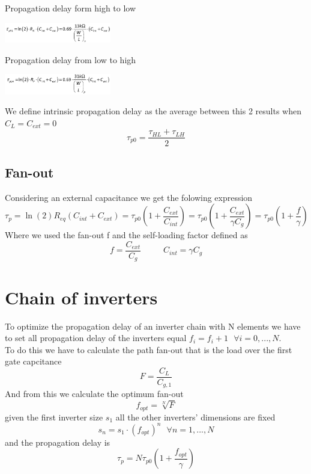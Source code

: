 Propagation delay form high to low

\centering
\includegraphics[width=0.35\textwidth]{C3_11.png}\\
\raggedright

\vspace{5mm}

Propagation delay from low to high 

\centering
\includegraphics[width=0.35\textwidth]{C3_12.png}\\
\raggedright

\vspace{5mm}
We define intrinsic propagation delay as the average between this 2 results when $C_L=C_{ext}=0$
\begin{equation}
\tau_{p0}=\frac{\tau_{HL}+\tau_{LH}}{2}
\end{equation}

\subsection{Fan-out}
Considering an external capacitance we get the folowing expression
\begin{equation}
\tau_p=\ln(2)R_{eq}(C_{int}+C_{ext})=\tau_{p0}\left(1+\frac{C_{ext}}{C_{int}}\right)=\tau_{p0}\left(1+\frac{C_{ext}}{\gamma C_g}\right)=\tau_{p0}\left(1+\frac{f}{\gamma}\right)
\end{equation}
Where we used the fan-out f and the self-loading factor defined as
\begin{equation}
f=\frac{C_{ext}}{C_g}\ \ \ \ \ \ \ \ \ \ \ \ C_{int}=\gamma C_g
\end{equation}

\section{Chain of inverters}

To optimize the propagation delay of an inverter chain with N elements we have to set all propagation delay of the inverters equal $f_i=f_i+1\ \ \  \forall i=0,...,N$.\\
To do this we have to calculate the path fan-out that is the load over the first gate capcitance
\begin{equation}
F=\frac{C_L}{C_{g,1}}
\end{equation} 
And from this we calculate the optimum fan-out 
\begin{equation}
f_{opt}=\sqrt[N]{F}
\end{equation}
given the first inverter size $s_1$ all the other inverters' dimensions are fixed 
\begin{equation}
s_n=s_1\cdot (f_{opt})^{n} \ \ \ \forall n=1,...,N 
\end{equation} 
and the propagation delay is 
\begin{equation}
\tau_p=N\tau_{p0}\left(1+\frac{f_{opt}}{\gamma} \right)
\end{equation}


